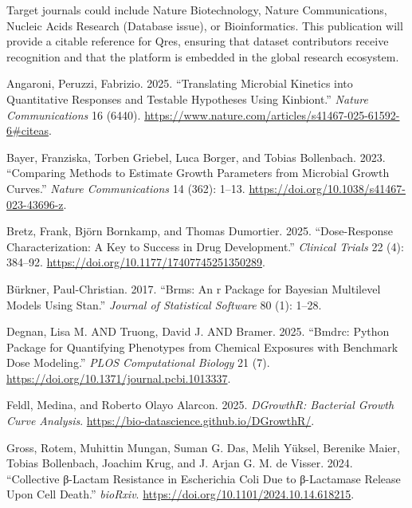 \documentclass[
]{article}
\newlength{\cslhangindent}
\newenvironment{CSLReferences}[2] %
 {\begin{list}{}{%
  \setlength{\itemindent}{0pt}
  \setlength{\leftmargin}{0pt}
  \setlength{\parsep}{0pt}
  \ifodd #1
   \setlength{\leftmargin}{\cslhangindent}
   \setlength{\itemindent}{-1\cslhangindent}
  \fi
  \setlength{\itemsep}{#2\baselineskip}}}
 {\end{list}}
\begin{document}
Target journals could include Nature Biotechnology, Nature
Communications, Nucleic Acids Research (Database issue), or
Bioinformatics. This publication will provide a citable reference for
Qres, ensuring that dataset contributors receive recognition and that
the platform is embedded in the global research ecosystem.

\label{refs}
\begin{CSLReferences}{1}{0}
Angaroni, Peruzzi, Fabrizio. 2025. {``Translating Microbial Kinetics
into Quantitative Responses and Testable Hypotheses Using Kinbiont.''}
\emph{Nature Communications} 16 (6440).
\url{https://www.nature.com/articles/s41467-025-61592-6\#citeas}.

Bayer, Franziska, Torben Griebel, Luca Borger, and Tobias Bollenbach.
2023. {``Comparing Methods to Estimate Growth Parameters from Microbial
Growth Curves.''} \emph{Nature Communications} 14 (362): 1--13.
\url{https://doi.org/10.1038/s41467-023-43696-z}.

Bretz, Frank, Björn Bornkamp, and Thomas Dumortier. 2025.
{``Dose-Response Characterization: A Key to Success in Drug
Development.''} \emph{Clinical Trials} 22 (4): 384--92.
\url{https://doi.org/10.1177/17407745251350289}.

Bürkner, Paul-Christian. 2017. {``Brms: An r Package for Bayesian
Multilevel Models Using Stan.''} \emph{Journal of Statistical Software}
80 (1): 1--28.

Degnan, Lisa M. AND Truong, David J. AND Bramer. 2025. {``Bmdrc: Python
Package for Quantifying Phenotypes from Chemical Exposures with
Benchmark Dose Modeling.''} \emph{PLOS Computational Biology} 21 (7).
\url{https://doi.org/10.1371/journal.pcbi.1013337}.

Feldl, Medina, and Roberto Olayo Alarcon. 2025. \emph{DGrowthR:
Bacterial Growth Curve Analysis}.
\url{https://bio-datascience.github.io/DGrowthR/}.

Gross, Rotem, Muhittin Mungan, Suman G. Das, Melih Yüksel, Berenike
Maier, Tobias Bollenbach, Joachim Krug, and J. Arjan G. M. de Visser.
2024. {``Collective β-Lactam Resistance in Escherichia Coli Due to
β-Lactamase Release Upon Cell Death.''} \emph{bioRxiv}.
\url{https://doi.org/10.1101/2024.10.14.618215}.


\end{CSLReferences}
\end{document}
